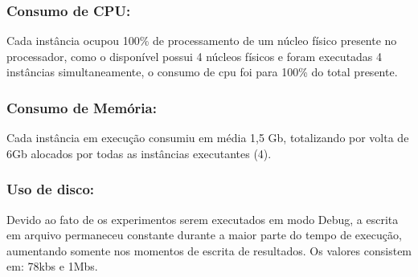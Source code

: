 \subsubsection{Consumo de CPU:}
Cada instância ocupou 100\% de processamento de um núcleo físico presente no processador, como o disponível possui 4 núcleos físicos e foram executadas 4 instâncias simultaneamente, o consumo de cpu foi para 100\% do total presente.

\subsubsection{Consumo de Memória:}
Cada instância em execução consumiu em média 1,5 Gb, totalizando por volta de 6Gb alocados por todas as instâncias executantes (4).

\subsubsection{Uso de disco:}
Devido ao fato de os experimentos serem executados em modo Debug, a escrita em arquivo permaneceu constante durante a maior parte do tempo de execução, aumentando somente nos momentos de escrita de resultados.
Os valores consistem em: 78kbs e 1Mbs.